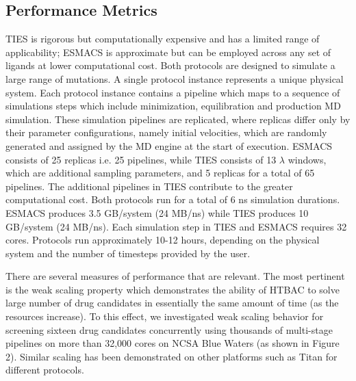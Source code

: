 \documentclass[conference]{IEEEtran}
\begin{document}
\subsection{Performance Metrics}\label{sec:performance}


TIES is rigorous but computationally expensive and has a limited range of
applicability; ESMACS is approximate but can be employed across any set of
ligands at lower computational cost. Both protocols are designed to simulate a
large range of mutations. A single protocol instance represents a unique
physical system. Each protocol instance contains a pipeline which maps to a
sequence of simulations steps which include minimization, equilibration and
production MD simulation. These simulation pipelines are replicated, where
replicas differ only by their parameter configurations, namely initial
velocities, which are randomly generated and assigned by the MD engine at the
start of execution. ESMACS consists of 25 replicas i.e. 25 pipelines, while
TIES consists of 13 $\lambda$ windows, which are additional sampling
parameters, and 5 replicas for a total of 65 pipelines. The additional
pipelines in TIES contribute to the greater computational cost. Both protocols
run for a total of 6 ns simulation durations. ESMACS produces 3.5 GB/system
(24 MB/ns) while TIES produces 10 GB/system (24 MB/ns). Each simulation step
in TIES and ESMACS requires 32 cores. Protocols run approximately 10-12 hours,
depending on the physical system and the number of timesteps provided by the
user.

There are several measures of performance that are relevant. The most
pertinent is the weak scaling property which demonstrates the ability of HTBAC
to solve large number of drug candidates in essentially the same amount of
time (as the resources increase). To this effect, we investigated weak scaling
behavior for screening sixteen drug candidates concurrently using thousands of
multi-stage pipelines on more than 32,000 cores on NCSA Blue Waters (as shown
in Figure 2). Similar scaling has been demonstrated on other platforms such as
Titan for different protocols.


\end{document}
